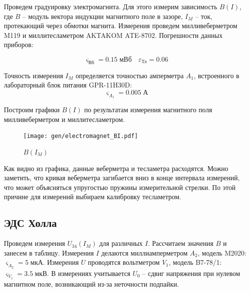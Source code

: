 \documentclass[12pt,a4paper]{article}
\begin{document}
	Проведем градуировку электромагнита. Для этого измерим зависимость $B(I)$, где $B$ -- модуль вектора индукции магнитного поле в зазоре, $I_M$ -- ток, протекающий через обмотки магнита. Измерения проведем милливеберметром M119 и миллитесламетром AKTAKOM ATE-8702. Погрешности данных приборов:
	
	$$ \varsigma_{\text{Вб}} = 0.15 \; \text{мВб} \quad \varepsilon_{\text{Тл}} = 0.06 $$
	
	Точность измерения $I_M$ определяется точностью амперметра $A_1$, встроенного в лабораторный блок питания GPR-11H30D: $$\varsigma_{A_1} = 0.005 \; \text{А}$$
	

	Построим графики $B(I)$ по результатам измерения магнитного поля милливеберметром и миллитесламетром.
	
	\begin{figure}[H]
		\texttt{[image: gen/electromagnet\_BI.pdf]}
		\caption{$B(I_M)$}
	\end{figure}

	Как видно из графика, данные веберметра и тесламетра расходятся. Можно заметить, что кривая веберметра загибается вниз в конце интервала измерений, что может объясняться упругостью пружины измерительной стрелки. По этой причине для измерений выбираем калибровку тесламетром.
	
	\subsection*{ЭДС Холла}

	Проведем измерения $U_{34}(I_M)$ для различных $I$. Рассчитаем значения $B$ и занесем в таблицу.
	Измерения $I$ делаются миллиамперметром $A_2$, модель M2020: $\varsigma_{A_2} = 5 \; \text{мкА} $.
	Измерения $U$ проводятся вольтметром $V_1$, модель B7-78/1: $\varsigma_{V_1} = 3.5 \; \text{мкВ}$.
	В измерениях учитывается $U_0$ -- сдвиг напряжения при нулевом магнитном поле, возникающий из-за неточности подпайки.
	
	
		
\end{document}
